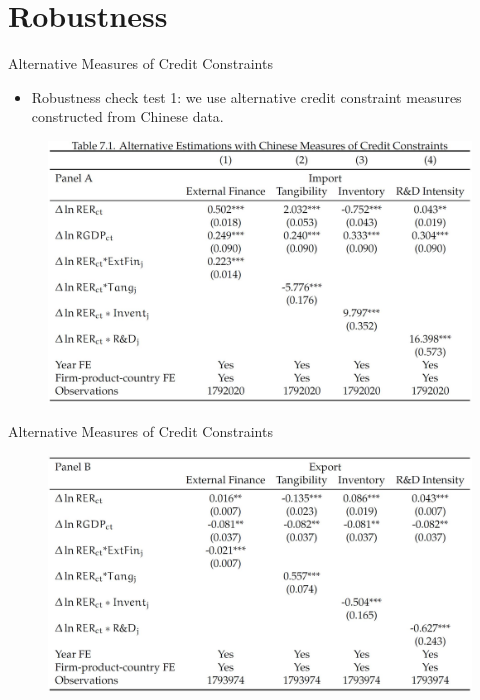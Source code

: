 \documentclass[10pt]{beamer}
\begin{document}
\section{Robustness}

\begin{frame}{Alternative Measures of Credit Constraints}
	\begin{itemize}
		\item Robustness check test 1: we use alternative credit constraint measures constructed from Chinese data.
	\end{itemize}
	\begin{figure}[htbp]
		\centering
		\includegraphics[width=0.9\columnwidth]{Table7.1A.jpg}
		\label{tab7.1A}
	\end{figure}
\end{frame}

\begin{frame}{Alternative Measures of Credit Constraints}
	\begin{figure}[htbp]
		\centering
		\includegraphics[width=0.9\columnwidth]{Table7.1B.jpg}
		\label{tab7.1B}
	\end{figure}
\end{frame}
\end{document}
